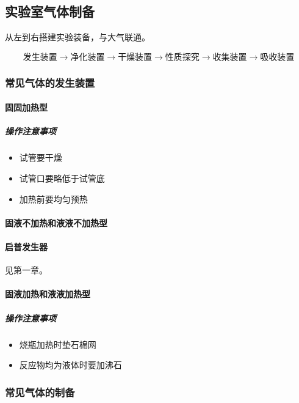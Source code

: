 \documentclass[10pt]{article}
\begin{document}
	\subsection{实验室气体制备}
	
	从左到右搭建实验装备，与大气联通。
	
	$$
	\text{发生装置} \rightarrow \text{净化装置} \rightarrow \text{干燥装置} \rightarrow \text{性质探究} \rightarrow \text{收集装置} \rightarrow \text{吸收装置}
	$$
	
	\subsubsection{常见气体的发生装置}
	
	
	\paragraph{固固加热型}
	
	\subparagraph{操作注意事项}
	
	\begin{itemize}
		\item 试管要干燥
		\item 试管口要略低于试管底
		\item 加热前要均匀预热
	\end{itemize}
	
	\paragraph{固液不加热和液液不加热型}
	
	\paragraph{启普发生器}
	
	见第一章。
	
	\paragraph{固液加热和液液加热型}
	
	\subparagraph{操作注意事项}
	
	\begin{itemize}
		\item 烧瓶加热时垫石棉网
		\item 反应物均为液体时要加沸石
	\end{itemize}
	
	\subsubsection{常见气体的制备}
	
\end{document}
